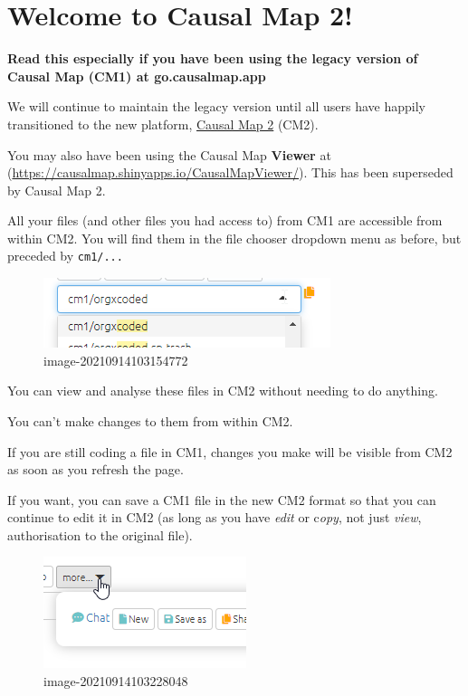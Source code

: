 \documentclass[
]{book}
\begin{document}
\hypertarget{welcome-to-causal-map-2}{%
\chapter{Welcome to Causal Map 2!}\label{welcome-to-causal-map-2}}

\textbf{Read this especially if you have been using the legacy version of Causal Map (CM1) at go.causalmap.app}

We will continue to maintain the legacy version until all users have happily transitioned to the new platform, \href{https://causalmap.shinyapps.io/CausalMap2/}{Causal Map 2} (CM2).

You may also have been using the Causal Map \textbf{Viewer} at (\url{https://causalmap.shinyapps.io/CausalMapViewer/}). This has been superseded by Causal Map 2.

All your files (and other files you had access to) from CM1 are accessible from within CM2. You will find them in the file chooser dropdown menu as before, but preceded by \texttt{cm1/...}

\begin{figure}
\centering
\includegraphics{_assets/image-20210914103154772.png}
\caption{image-20210914103154772}
\end{figure}

You can view and analyse these files in CM2 without needing to do anything.

You can't make changes to them from within CM2.

If you are still coding a file in CM1, changes you make will be visible from CM2 as soon as you refresh the page.

If you want, you can save a CM1 file in the new CM2 format so that you can continue to edit it in CM2 (as long as you have \emph{edit} or c\emph{opy}, not just \emph{view}, authorisation to the original file).

\begin{figure}
\centering
\includegraphics{_assets/image-20210914103228048.png}
\caption{image-20210914103228048}
\end{figure}
\end{document}
